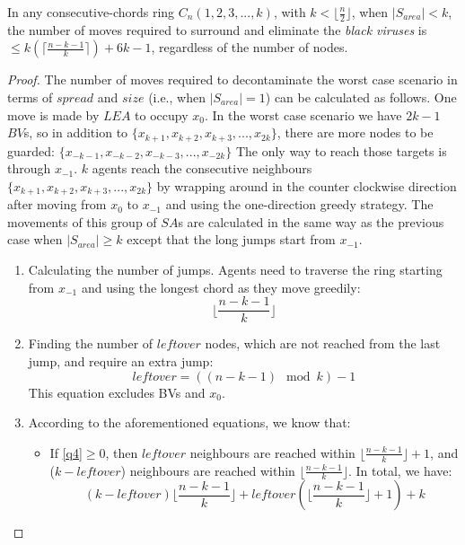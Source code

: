 \begin{theorem}
In any consecutive-chords ring $C_n(1,2,3,...,k)$, with  $ k  < \lfloor\frac{n}{2}\rfloor$, when $|S_{area}|< k$, the number of moves required to surround and eliminate the {\it black viruses} is $\leq k(\lceil \frac {n-k-1}{k} \rceil) +6k-1$, regardless of the number of nodes.
\end{theorem}


\begin{proof}
The number of moves required to decontaminate the worst case scenario in terms of $spread$ and $size$ (i.e., when $|S_{area}|=1$) can be calculated as follows. One move is made by $LEA$ to occupy $x_{0}$. In the worst case scenario we have $2k-1$ $BV$s, so in addition to $\{x_{k+1},x_{k+2},x_{k+3},...,x_{2k}\}$, there are more nodes to be guarded: $\{x_{-k-1},x_{-k-2},x_{-k-3},...,x_{-2k}\}$ The only way to reach those targets is through $x_{-1}$. $k$ agents reach the  consecutive neighbours $\{x_{k+1},x_{k+2},x_{k+3},...,x_{2k}\}$ by wrapping around in the counter clockwise direction after moving from $x_{0}$ to $x_{-1}$ and using the one-direction greedy strategy. The movements of this group of  $SA$s are calculated in the same way as the previous case when $|S_{area}|\ge k$ except that the long jumps start from $x_{-1}$.

\begin{enumerate}
  \item Calculating the number of jumps. Agents need to traverse the ring starting from $x_{-1}$ and using the longest chord as they move greedily: \begin{equation}\label{q3}
\lfloor \frac {n-k-1}{k} \rfloor 
\end {equation}
  \item Finding the number of $leftover$ nodes, which are not reached from the last jump, and require an extra jump:
 \begin{equation}\label{q4}
leftover=((n-k-1)\mod k ) -1 
\end {equation}   
This equation excludes BVs and $x_{0}$.
  
  \item According to the aforementioned equations, we know that: 
\begin{itemize}

\item If \ref{q4}$\ge 0$, then $leftover$  neighbours are reached within $\lfloor \frac {n-k-1}{k} \rfloor  +1$,  
and ($k- leftover$) neighbours are reached within $\lfloor \frac {n-k-1}{k} \rfloor  $. In total, we have:\\
$$(k- leftover) \lfloor \frac {n-k-1}{k} \rfloor + leftover (\lfloor \frac {n-k-1}{k} \rfloor  +1)+k$$


\end{itemize}
\end{enumerate}
\end{proof}
